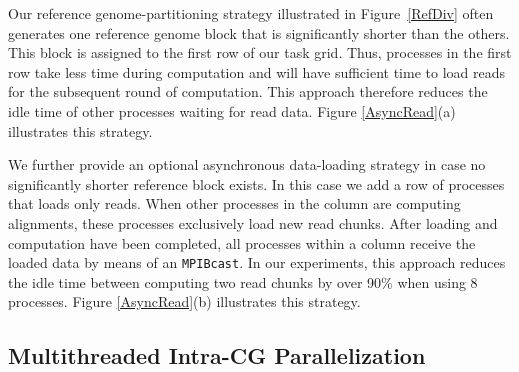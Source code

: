 Our reference genome-partitioning strategy illustrated in
Figure~\ref{RefDiv} often generates one reference genome block that is
significantly shorter than the others. This block is assigned to the
first row of our task grid. Thus, processes in the first row take less
time during computation and will have sufficient time to load reads
for the subsequent round of computation. This approach therefore
reduces the idle time of other processes waiting for read data.
Figure \ref{AsyncRead}(a) illustrates this strategy.

We further provide an optional asynchronous data-loading strategy in
case no significantly shorter reference block exists. In this
case we add a row of processes that loads only reads. When other
processes in the column are computing alignments, these processes
exclusively load new read chunks. After loading and computation have
been completed, all processes within a column receive the loaded data
by means of an \texttt{MPI\textunderscore Bcast}. In our experiments,
this approach reduces the idle time between computing two read chunks
by over 90\% when using 8 processes. Figure \ref{AsyncRead}(b)
illustrates this strategy.

\subsection{Multithreaded Intra-CG Parallelization}

